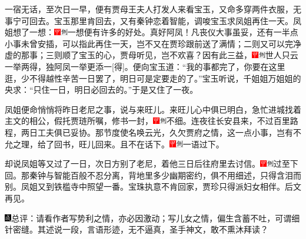 一宿无话，至次日一早，便有贾母王夫人打发人来看宝玉，又命多穿两件衣服，无事宁可回去。宝玉那里肯回去，又有秦钟恋着智能，调唆宝玉求凤姐再住一天。凤姐想了一想：{\includegraphics[width=3mm]{../Images/00002}\includegraphics[width=3mm]{../Images/00011}\footnotesize \kaishu 一想便有许多的好处。真好阿凤！}凡丧仪大事虽妥，还有一半点小事未曾安插，可以指此再住一天，岂不又在贾珍跟前送了满情；二则又可以完净虚的那事；三则顺了宝玉的心，贾母听见，岂不欢喜？因有此三益，{\includegraphics[width=3mm]{../Images/00002}\includegraphics[width=3mm]{../Images/00011}\footnotesize \kaishu 世人只云一举两得，独阿凤一举更添一{[}得{]}。}便向宝玉道：“我的事都完了，你要在这里逛，少不得越性辛苦一日罢了，明日可是定要走的了。”宝玉听说，千姐姐万姐姐的央求：“只住一日，明日必回去的。”于是又住了一夜。

凤姐便命悄悄将昨日老尼之事，说与来旺儿。来旺儿心中俱已明白，急忙进城找着主文的相公，假托贾琏所嘱，修书一封，{\includegraphics[width=3mm]{../Images/00002}\includegraphics[width=3mm]{../Images/00011}\footnotesize \kaishu 不细。}连夜往长安县来，不过百里路程，两日工夫俱已妥协。那节度使名唤云光，久欠贾府之情，这一点小事，岂有不允之理，给了回书，旺儿回来。且不在话下。{\includegraphics[width=3mm]{../Images/00002}\includegraphics[width=3mm]{../Images/00011}\footnotesize \kaishu 一语过下。}

却说凤姐等又过了一日，次日方别了老尼，着他三日后往府里去讨信。{\includegraphics[width=3mm]{../Images/00002}\includegraphics[width=3mm]{../Images/00011}\footnotesize \kaishu 过至下回。}那秦钟与智能百般不忍分离，背地里多少幽期密约，俱不用细述，只得含泪而别。凤姐又到铁槛寺中照望一番。宝珠执意不肯回家，贾珍只得派妇女相伴。后文再见。

{\includegraphics[width=3mm]{../Images/00005}\kaishu 总评：请看作者写势利之情，亦必因激动；写儿女之情，偏生含蓄不吐，可谓细针密缝。其述说一段，言语形迹，无不逼真，圣手神文，敢不熏沐拜读？}
